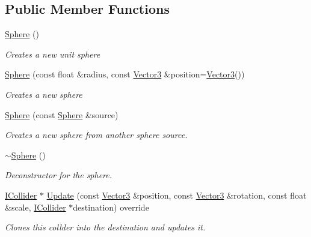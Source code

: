 \subsection*{Public Member Functions}
\begin{DoxyCompactItemize}
\item 
\hyperlink{class_flounder_1_1_sphere_a194a9159be0f16401651ca5e616e47cf}{Sphere} ()
\begin{DoxyCompactList}\small\item\em Creates a new unit sphere \end{DoxyCompactList}\item 
\hyperlink{class_flounder_1_1_sphere_acfa33a8e19ff9d2b7e818568be514dc8}{Sphere} (const float \&radius, const \hyperlink{class_flounder_1_1_vector3}{Vector3} \&position=\hyperlink{class_flounder_1_1_vector3}{Vector3}())
\begin{DoxyCompactList}\small\item\em Creates a new sphere \end{DoxyCompactList}\item 
\hyperlink{class_flounder_1_1_sphere_ab28e482da6fe13fb103aa2d44c76739c}{Sphere} (const \hyperlink{class_flounder_1_1_sphere}{Sphere} \&source)
\begin{DoxyCompactList}\small\item\em Creates a new sphere from another sphere source. \end{DoxyCompactList}\item 
\hyperlink{class_flounder_1_1_sphere_aae50198206864b0be72b174a2d2a237e}{$\sim$\+Sphere} ()
\begin{DoxyCompactList}\small\item\em Deconstructor for the sphere. \end{DoxyCompactList}\item 
\hyperlink{class_flounder_1_1_i_collider}{I\+Collider} $\ast$ \hyperlink{class_flounder_1_1_sphere_a32cbe19edf8aa494179071a7c0291811}{Update} (const \hyperlink{class_flounder_1_1_vector3}{Vector3} \&position, const \hyperlink{class_flounder_1_1_vector3}{Vector3} \&rotation, const float \&scale, \hyperlink{class_flounder_1_1_i_collider}{I\+Collider} $\ast$destination) override
\begin{DoxyCompactList}\small\item\em Clones this collder into the destination and updates it. \end{DoxyCompactList}\item 
\mbox{\label{class_flounder_1_1_sphere_aa9c617ab654947b0620a2e7342736afc}} 

\end{DoxyCompactItemize}
